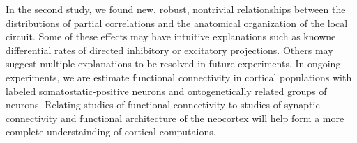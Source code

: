 In the second study,  we found new, robust, nontrivial relationships between the distributions of partial correlations and the anatomical organization of the local circuit. Some of these effects may have intuitive explanations such as knowne  differential  rates of directed inhibitory or excitatory projections.  Others may suggest multiple explanations to be resolved in future experiments. In ongoing experiments, we are estimate functional connectivity in cortical populations with labeled somatostatic-positive neurons and ontogenetically related groups of neurons. Relating studies of functional connectivity to studies of synaptic connectivity and functional architecture of the neocortex will help form a more complete understainding of cortical computaions.
